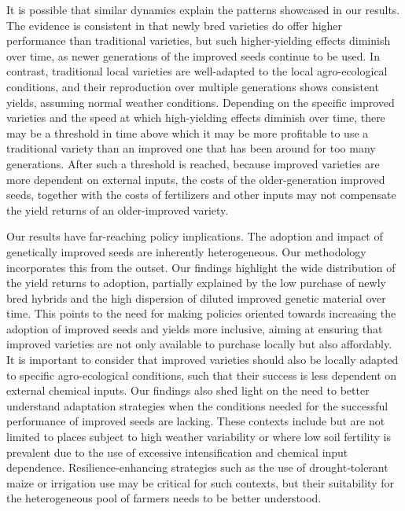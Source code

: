\documentclass[11pt]{article}
\begin{document}
It is possible that similar dynamics explain the patterns showcased in our results. The evidence is consistent in that newly bred varieties do offer higher performance than traditional varieties, but such higher-yielding effects diminish over time, as newer generations of the improved seeds continue to be used. In contrast, traditional local varieties are well-adapted to the local agro-ecological conditions, and their reproduction over multiple generations shows consistent yields, assuming normal weather conditions. Depending on the specific improved varieties and the speed at which high-yielding effects diminish over time, there may be a threshold in time above which it may be more profitable to use a traditional variety than an improved one that has been around for too many generations. After such a threshold is reached, because improved varieties are more dependent on external inputs, the costs of the older-generation improved seeds, together with the costs of fertilizers and other inputs may not compensate the yield returns of an older-improved variety. \par

Our results have far-reaching policy implications. The adoption and impact of genetically improved seeds are inherently heterogeneous. Our methodology incorporates this from the outset. Our findings highlight the wide distribution of the yield returns to adoption, partially explained by the low purchase of newly bred hybrids and the high dispersion of diluted improved genetic material over time. This points to the need for making policies oriented towards increasing the adoption of improved seeds and yields more inclusive, aiming at ensuring that improved varieties are not only available to purchase locally but also affordably. It is important to consider that improved varieties should also be locally adapted to specific agro-ecological conditions, such that their success is less dependent on external chemical inputs. Our findings also shed light on the need to better understand adaptation strategies when the conditions needed for the successful performance of improved seeds are lacking. These contexts include but are not limited to places subject to high weather variability or where low soil fertility is prevalent due to the use of excessive intensification and chemical input dependence. Resilience-enhancing strategies such as the use of drought-tolerant maize or irrigation use may be critical for such contexts, but their suitability for the heterogeneous pool of farmers needs to be better understood. 









\end{document}
